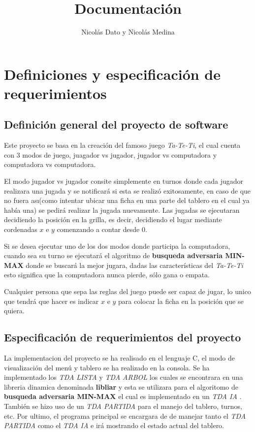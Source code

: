\documentclass[12pt,twocolum,a4paper]{article}
\title{Documentaci\'on}
\author{Nicol\'as Dato y Nicol\'as Medina }
\date{}
\begin{document}
\maketitle

\newpage
\tableofcontents
\newpage

\section{Definiciones y especificaci\'on de requerimientos}

\subsection{Definici\'on general del proyecto de software}
	Este proyecto se basa en la creaci\'on del famoso juego \emph{Ta-Te-Ti}, el cual cuenta con 3 modos de juego, juagador vs jugador, jugador vs computadora y computadora vs computadora.

	El modo jugador vs jugador consite simplemente en turnos donde cada jugador realizara una jugada y se notificar\'a si esta se realiz\'o exitosamente, en caso de que no fuera as\i (como intentar ubicar una ficha en una parte del tablero en el cual ya hab\'ia una) se pedir\'a realizar la jugada nuevamente. Las jugadas se ejecutaran decidiendo la posici\'on en la grilla, es decir, decidiendo el lugar mediante cordenadas $x$ e $y$ comenzando a contar desde $0$.

	Si se desea ejecutar uno de los dos modos donde participa la computadora, cuando sea su turno se ejecutar\'a el algoritmo de {\bf busqueda adversaria MIN-MAX} donde se buscar\'a la mejor jugara, dadas las caracter\'isticas del \emph{Ta-Te-Ti} esto significa que la computadora nunca pierde, s\'olo gana o empata.

    Cualquier persona que sepa las reglas del juego puede ser capaz de jugar, lo unico que tendr\'a que hacer es indicar $x$ e $y$ para colocar la ficha en la posici\'on que se quiera.

\subsection{Especificaci\'on de requerimientos del proyecto}
    La implementacion del proyecto se ha realisado en el lenguaje C, el modo de visualizaci\'on del men\'u y tablero se ha realizado en la consola. Se ha implementado los {\itshape TDA LISTA} y {\itshape TDA ARBOL} los cuales se encontrara en una libreria dinamica denominada {\bf libliar} y esta se utilizara para el algoritomo de {\bf busqueda adversaria MIN-MAX} el cual es implementado en un {\itshape TDA IA} . Tambi\'en se hizo uso de un {\itshape TDA PARTIDA} para el manejo del tablero, turnos, etc. Por ultimo, el programa principal se encargara de de manejar tanto el {\itshape TDA PARTIDA} como el {\itshape TDA IA} e ir\'a mostrando el estado actual del tablero.
\end{document}
